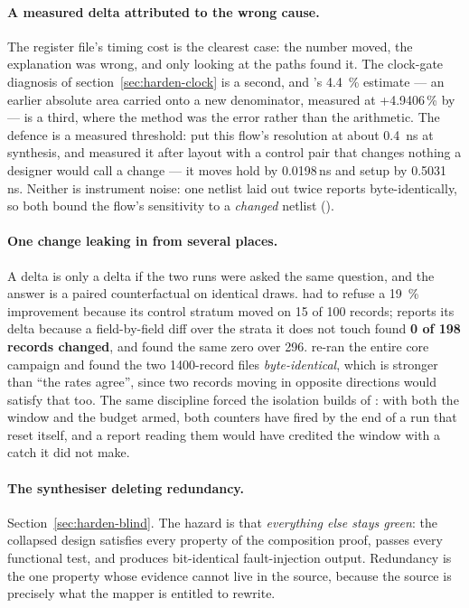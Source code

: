 \paragraph{A measured delta attributed to the wrong cause.}
The register file's timing cost is the clearest case: the number moved,
the explanation was wrong, and only looking at the paths found it. The
clock-gate diagnosis of section~\ref{sec:harden-clock} is a second, and
's \SI{+4.4}{\percent} estimate --- an earlier absolute area
carried onto a new denominator, measured at +4.9406\,\% by
 --- is a third, where the method was the error
rather than the arithmetic. The defence is a measured threshold:
 put this flow's resolution at about
\SI{0.4}{\nano\second} at synthesis, and
 measured it after layout with a control pair that changes
nothing a designer would call a change --- it moves hold by
0.0198\,ns and setup by 0.5031\,ns. Neither is instrument noise: one
netlist laid out twice reports byte-identically, so both bound the
flow's sensitivity to a \emph{changed} netlist ().

\paragraph{One change leaking in from several places.}
A delta is only a delta if the two runs were asked the same question,
and the answer is a paired counterfactual on identical draws.
 had to refuse a \SI{19}{\percent} improvement
because its control stratum moved on 15 of 100 records; 
reports its delta because a field-by-field diff over the strata it does
not touch found \textbf{0 of 198 records changed}, and  found
the same zero over 296.  re-ran the entire core campaign and found the two
\num{1400}-record files \emph{byte-identical}, which is stronger than
``the rates agree'', since two records moving in opposite directions
would satisfy that too. The same discipline forced the isolation builds
of : with both the window and the budget armed,
both counters have fired by the end of a run that reset itself, and a
report reading them would have credited the window with a catch it did
not make.

\paragraph{The synthesiser deleting redundancy.}
Section~\ref{sec:harden-blind}. The hazard is that \emph{everything else
stays green}: the collapsed design satisfies every property of the
composition proof, passes every functional test, and produces
bit-identical fault-injection output. Redundancy is the one property
whose evidence cannot live in the source, because the source is
precisely what the mapper is entitled to rewrite.

